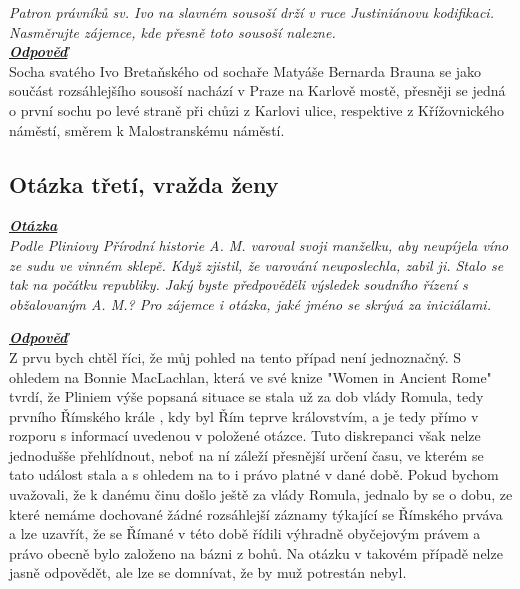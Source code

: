 \documentclass{article}
\begin{document}
\indent\textit{Patron právníků sv. Ivo na slavném sousoší drží v ruce Justiniánovu kodifikaci. Nasměrujte zájemce, kde přesně toto sousoší nalezne.}\\

\noindent\noindent\textbf{\textit{\underline{Odpověď}}}\\

\indent Socha svatého Ivo Bretaňského od sochaře Matyáše Bernarda Brauna se jako součást rozsáhlejšího sousoší nachází v Praze na Karlově mostě, přesněji se jedná o první sochu po levé straně při chůzi z Karlovi ulice, respektive z Křížovnického náměstí, směrem k Malostranskému náměstí.

\subsection{Otázka třetí, vražda ženy}
\textbf{\textit{\underline{Otázka}}}\\

\textit{Podle Pliniovy Přírodní historie A. M. varoval svoji manželku, aby neupíjela víno ze sudu ve vinném sklepě. Když zjistil, že varování neuposlechla, zabil ji. Stalo se tak na počátku republiky. Jaký byste předpověděli výsledek soudního řízení s obžalovaným A. M.? Pro zájemce i otázka, jaké jméno se skrývá za iniciálami.}\\

\newpage

\noindent\noindent\textbf{\textit{\underline{Odpověď}}}\\

Z prvu bych chtěl říci, že můj pohled na tento případ není jednoznačný. S ohledem na Bonnie MacLachlan, která ve své knize "Women in Ancient Rome" tvrdí, že Pliniem výše popsaná situace se stala už za dob vlády Romula, tedy prvního Římského krále , kdy byl Řím teprve královstvím, a je tedy přímo v rozporu s informací uvedenou v položené otázce. Tuto diskrepanci však nelze jednodušše přehlídnout, neboť na ní záleží přesnější určení času, ve kterém se tato událost stala a s ohledem na to i právo platné v dané době. Pokud bychom uvažovali, že k danému činu došlo ještě za vlády Romula, jednalo by se o dobu, ze které nemáme dochované žádné rozsáhlejší záznamy týkající se Římského prváva a lze uzavřít, že se Římané v této době řídili výhradně obyčejovým právem a právo obecně bylo založeno na bázni z bohů. Na otázku v takovém případě nelze jasně odpovědět, ale lze se domnívat, že by muž potrestán nebyl.\\
\end{document}

